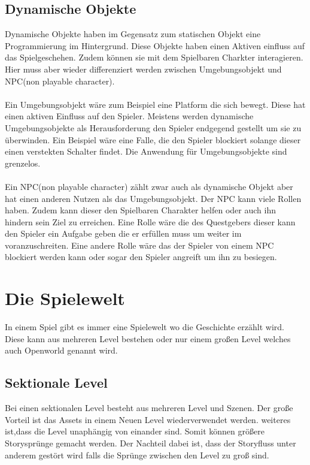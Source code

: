 \subsection{Dynamische Objekte}
Dynamische Objekte haben im Gegensatz zum statischen Objekt eine Programmierung im Hintergrund. Diese Objekte haben einen Aktiven einfluss auf das Spielgeschehen. Zudem können sie mit dem Spielbaren Charkter interagieren. Hier muss aber wieder differenziert werden zwischen Umgebungsobjekt und NPC(non playable character).\\\\
Ein Umgebungsobjekt wäre zum Beispiel eine Platform die sich bewegt. Diese hat einen aktiven Einfluss auf den Spieler. Meistens werden dynamische Umgebungsobjekte als Herausforderung den Spieler endgegend gestellt um sie zu überwinden. Ein Beispiel wäre eine Falle, die den Spieler blockiert solange dieser einen verstekten Schalter findet. Die Anwendung für Umgebungsobjekte sind grenzelos.\\\\
Ein NPC(non playable character) zählt zwar auch als dynamische Objekt aber hat einen anderen Nutzen als das Umgebungsobjekt. Der NPC kann viele Rollen haben. Zudem kann dieser den Spielbaren Charakter helfen oder auch ihn hindern sein Ziel zu erreichen. Eine Rolle wäre die des Questgebers dieser kann den Spieler ein Aufgabe geben die er erfüllen muss um weiter im voranzuschreiten. Eine andere Rolle wäre das der Spieler von einem NPC blockiert werden kann oder sogar den Spieler angreift um ihn zu besiegen.

\pagebreak

\section{Die Spielewelt}
In einem Spiel gibt es immer eine Spielewelt wo die Geschichte erzählt wird. Diese kann aus mehreren Level bestehen oder nur einem großen Level welches auch Openworld genannt wird.


\subsection {Sektionale Level}
Bei einen sektionalen Level besteht aus mehreren Level und Szenen. Der große Vorteil ist das Assets in einem Neuen Level wiederverwendet werden. weiteres ist,dass die Level unaphängig von einander sind. Somit können größere Storysprünge gemacht werden. Der Nachteil dabei ist, dass der Storyfluss unter anderem gestört wird falls die Sprünge zwischen den Level zu groß sind. 

